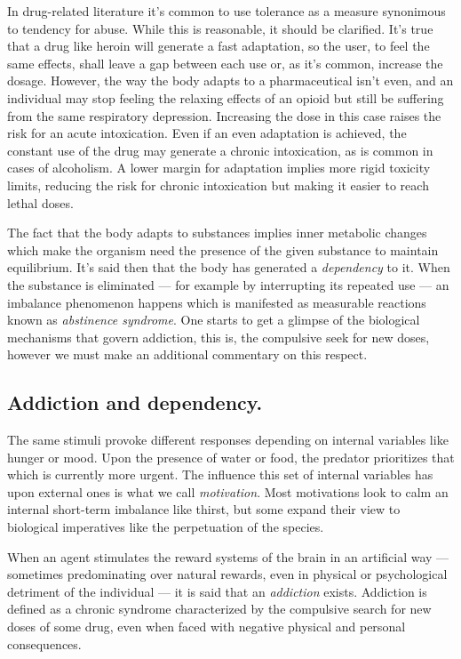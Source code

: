 In drug-related literature it's common to use tolerance as a measure synonimous to tendency for abuse. While this is reasonable, it should be clarified. It's true that a drug like heroin will generate a fast adaptation, so the user, to feel the same effects, shall leave a gap between each use or, as it's common, increase the dosage. However, the way the body adapts to a pharmaceutical isn't even, and an individual may stop feeling the relaxing effects of an opioid but still be suffering from the same respiratory depression. Increasing the dose in this case raises the risk for an acute intoxication. Even if an even adaptation is achieved, the constant use of the drug may generate a chronic intoxication, as is common in cases of alcoholism. A lower margin for adaptation implies more rigid toxicity limits, reducing the risk for chronic intoxication but making it easier to reach lethal doses.

The fact that the body adapts to substances implies inner metabolic changes which make the organism need the presence of the given substance to maintain equilibrium. It's said then that the body has generated a \textit{dependency} to it. When the substance is eliminated --- for example by interrupting its repeated use --- an imbalance phenomenon happens which is manifested as measurable reactions known as \textit{abstinence syndrome}. One starts to get a glimpse of the biological mechanisms that govern addiction, this is, the compulsive seek for new doses, however we must make an additional commentary on this respect.

\newpage

\subsection{Addiction and dependency.}

The same stimuli provoke different responses depending on internal variables like hunger or mood. Upon the presence of water or food, the predator prioritizes that which is currently more urgent. The influence this set of internal variables has upon external ones is what we call \textit{motivation}. Most motivations look to calm an internal short-term imbalance like thirst, but some expand their view to biological imperatives like the perpetuation of the species.

When an agent stimulates the reward systems of the brain in an artificial way --- sometimes predominating over natural rewards, even in physical or psychological detriment of the individual --- it is said that an \textit{addiction} exists. Addiction is defined as a chronic syndrome characterized by the compulsive search for new doses of some drug, even when faced with negative physical and personal consequences.

